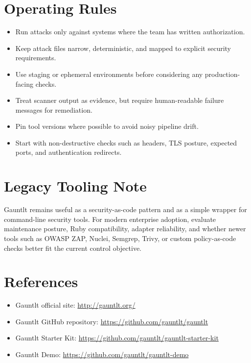 \documentclass[11pt]{article}
\begin{document}
\section{Operating Rules}
\begin{itemize}
  \item Run attacks only against systems where the team has written authorization.
  \item Keep attack files narrow, deterministic, and mapped to explicit security requirements.
  \item Use staging or ephemeral environments before considering any production-facing checks.
  \item Treat scanner output as evidence, but require human-readable failure messages for remediation.
  \item Pin tool versions where possible to avoid noisy pipeline drift.
  \item Start with non-destructive checks such as headers, TLS posture, expected ports, and authentication redirects.
\end{itemize}

\section{Legacy Tooling Note}
Gauntlt remains useful as a security-as-code pattern and as a simple wrapper for command-line security tools. For modern enterprise adoption, evaluate maintenance posture, Ruby compatibility, adapter reliability, and whether newer tools such as OWASP ZAP, Nuclei, Semgrep, Trivy, or custom policy-as-code checks better fit the current control objective.

\section*{References}
\begin{itemize}
  \item Gauntlt official site: \url{http://gauntlt.org/}
  \item Gauntlt GitHub repository: \url{https://github.com/gauntlt/gauntlt}
  \item Gauntlt Starter Kit: \url{https://github.com/gauntlt/gauntlt-starter-kit}
  \item Gauntlt Demo: \url{https://github.com/gauntlt/gauntlt-demo}
\end{itemize}
\end{document}
